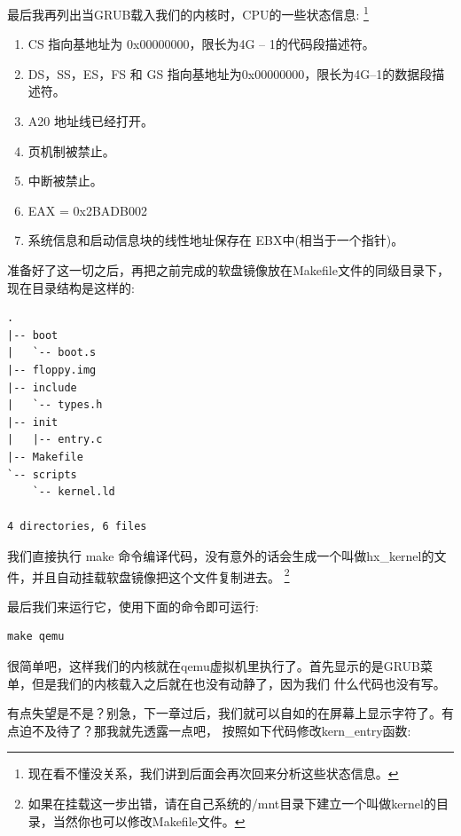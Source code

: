 \par 最后我再列出当GRUB载入我们的内核时，CPU的一些状态信息:\allowbreak
\footnote{现在看不懂没关系，我们讲到后面会再次回来分析这些状态信息。}

\begin{mdframed}
	\begin{enumerate}
		\item CS 指向基地址为 0x00000000，限长为4G – 1的代码段描述符。
		\item DS，SS，ES，FS 和 GS 指向基地址为0x00000000，限长为4G–1的数据段描述符。
		\item A20 地址线已经打开。
		\item 页机制被禁止。
		\item 中断被禁止。
		\item EAX = 0x2BADB002
		\item 系统信息和启动信息块的线性地址保存在 EBX中(相当于一个指针)。
	\end{enumerate}
\end{mdframed}

\par 准备好了这一切之后，再把之前完成的软盘镜像放在Makefile文件的同级目录下，现在目录结构是这样的:
\begin{Verbatim}[frame=single]
.
|-- boot
|   `-- boot.s
|-- floppy.img
|-- include
|   `-- types.h
|-- init
|   |-- entry.c
|-- Makefile
`-- scripts
    `-- kernel.ld

4 directories, 6 files
\end{Verbatim}

\par 我们直接执行 make 命令编译代码，没有意外的话会生成一个叫做hx\_kernel的文件，并且自动挂载软盘镜像把这个文件复制进去。\allowbreak
\footnote{如果在挂载这一步出错，请在自己系统的/mnt目录下建立一个叫做kernel的目录，当然你也可以修改Makefile文件。}

\par 最后我们来运行它，使用下面的命令即可运行:

\begin{Verbatim}[frame=single]
  make qemu
\end{Verbatim}

\par 很简单吧，这样我们的内核就在qemu虚拟机里执行了。首先显示的是GRUB菜单，但是我们的内核载入之后就在也没有动静了，因为我们\allowbreak
什么代码也没有写。

\par 有点失望是不是？别急，下一章过后，我们就可以自如的在屏幕上显示字符了。有点迫不及待了？那我就先透露一点吧，\allowbreak
按照如下代码修改kern\_entry函数:

